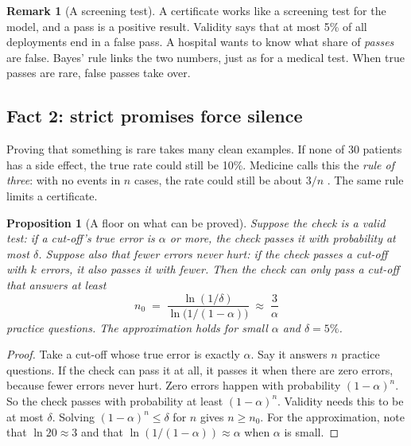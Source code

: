 \documentclass[11pt]{article}
\theoremstyle{plain}
\newtheorem{proposition}{Proposition}
\theoremstyle{definition}
\newtheorem{remark}{Remark}
\begin{document}
\begin{remark}[A screening test]
A certificate works like a screening test for the model, and a pass is a positive result. Validity says that at most 5\% of all deployments end in a false pass. A hospital wants to know what share of \emph{passes} are false. Bayes' rule links the two numbers, just as for a medical test. When true passes are rare, false passes take over.
\end{remark}

\subsection{Fact 2: strict promises force silence}

Proving that something is rare takes many clean examples. If none of 30 patients has a side effect, the true rate could still be 10\%. Medicine calls this the \emph{rule of three}: with no events in $n$ cases, the rate could still be about $3/n$ \citep{hanley1983nothing}. The same rule limits a certificate.

\begin{proposition}[A floor on what can be proved]
\label{prop:three}
Suppose the check is a valid test: if a cut-off's true error is $\alpha$ or more, the check passes it with probability at most $\delta$. Suppose also that fewer errors never hurt: if the check passes a cut-off with $k$ errors, it also passes it with fewer. Then the check can only pass a cut-off that answers at least
\begin{equation}
n_0 \;=\; \frac{\ln(1/\delta)}{\ln\!\big(1/(1-\alpha)\big)} \;\approx\; \frac{3}{\alpha}
\label{eq:three}
\end{equation}
practice questions. The approximation holds for small $\alpha$ and $\delta = 5\%$.
\end{proposition}

\begin{proof}
Take a cut-off whose true error is exactly $\alpha$. Say it answers $n$ practice questions. If the check can pass it at all, it passes it when there are zero errors, because fewer errors never hurt. Zero errors happen with probability $(1-\alpha)^n$. So the check passes with probability at least $(1-\alpha)^n$. Validity needs this to be at most $\delta$. Solving $(1-\alpha)^n \le \delta$ for $n$ gives $n \ge n_0$. For the approximation, note that $\ln 20 \approx 3$ and that $\ln(1/(1-\alpha)) \approx \alpha$ when $\alpha$ is small.
\end{proof}
\end{document}
